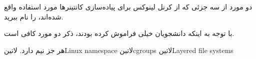 
دو مورد از سه جزئی که از کرنل لینوکس برای پیاده‌سازی کانتینرها مورد استفاده واقع شده‌اند، را نام ببرید.


\begin{پاسخ}

با توجه به اینکه دانشجویان خیلی فراموش کرده بودند، ذکر دو مورد کافی است.

هر جز نیم دارد.
 ‌لاتین{Linux namespace}
 ‌لاتین{cgroups}
 ‌لاتین{Layered file systems}

\end{پاسخ}
